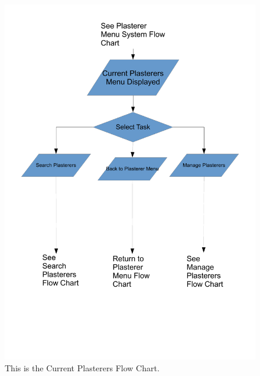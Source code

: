 \begin{figure}[H]
\includegraphics[scale=0.5]{./Design/images/FlowChartCurrentPlasterers.pdf}
    \caption{This is the Current Plasterers Flow Chart.} 
\label{fig:FlowChartCurrentPlasterers}
\end{figure}


